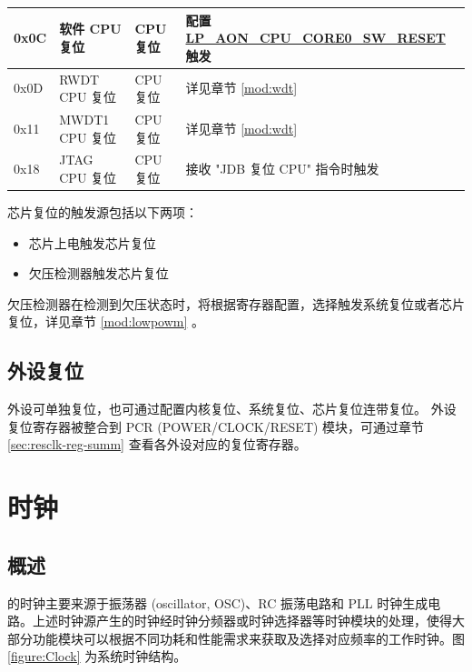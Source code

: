 \documentclass[main\_\_CN.tex]{subfiles}
\begin{document}
\begin{table}[H]
\begin{threeparttable}
\begin{tabular}{ |l|m{3.5cm}|m{1.8cm}|m{9.2cm}| }
         0x0C & 软件 CPU 复位 & CPU 复位 & 配置 \hyperref[fielddesc:LPAONCPUCORE0SWRESET]{LP\_AON\_CPU\_CORE0\_SW\_RESET} 触发\\
        \hline
        0x0D & RWDT CPU 复位 & CPU 复位 & 详见章节 \ref{mod:wdt} \textit{\nameref{mod:wdt}}
        \\\hline
        0x11 & MWDT1 CPU 复位 & CPU 复位 & 详见章节 \ref{mod:wdt} \textit{\nameref{mod:wdt}}
        \\\hline
        0x18 & JTAG CPU 复位 & CPU 复位 & 接收 "JDB 复位 CPU" 指令时触发
        \\\hline
\end{tabular}
        \begin{tablenotes}
            \item[1] 芯片复位的触发源包括以下两项：
                \begin{itemize}
                \item 芯片上电触发芯片复位
                \item 欠压检测器触发芯片复位
                \end{itemize}
            \item[2] 欠压检测器在检测到欠压状态时，将根据寄存器配置，选择触发系统复位或者芯片复位，详见章节 \ref{mod:lowpowm} \textit{}。
        \end{tablenotes}
     \end{threeparttable}
    \end{table}

\subsection{外设复位}

外设可单独复位，也可通过配置内核复位、系统复位、芯片复位连带复位。\chipname{} 外设复位寄存器被整合到 PCR (POWER/CLOCK/RESET) 模块，可通过章节 \ref{sec:resclk-reg-summ}\textit{} 查看各外设对应的复位寄存器。

\section{时钟}

\subsection{概述}

\chipname{} 的时钟主要来源于振荡器 (oscillator, OSC)、RC 振荡电路和 PLL 时钟生成电路。上述时钟源产生的时钟经时钟分频器或时钟选择器等时钟模块的处理，使得大部分功能模块可以根据不同功耗和性能需求来获取及选择对应频率的工作时钟。图 \ref{figure:Clock} 为系统时钟结构。
\end{document}
